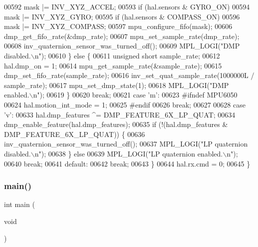 \begin{DoxyCode}
00592                 mask |= INV\_XYZ\_ACCEL;
00593             \textcolor{keywordflow}{if} (hal.sensors & GYRO_ON)
00594                 mask |= INV\_XYZ\_GYRO;
00595             \textcolor{keywordflow}{if} (hal.sensors & COMPASS_ON)
00596                 mask |= INV\_XYZ\_COMPASS;
00597             mpu\_configure\_fifo(mask);
00606             dmp\_get\_fifo\_rate(&dmp\_rate);
00607             mpu\_set\_sample\_rate(dmp\_rate);
00608             inv\_quaternion\_sensor\_was\_turned\_off();
00609             MPL\_LOGI(\textcolor{stringliteral}{"DMP disabled.\(\backslash\)n"});
00610         \} \textcolor{keywordflow}{else} \{
00611             \textcolor{keywordtype}{unsigned} \textcolor{keywordtype}{short} sample\_rate;
00612             hal.dmp_on = 1;
00614             mpu\_get\_sample\_rate(&sample\_rate);
00615             dmp\_set\_fifo\_rate(sample\_rate);
00616             inv\_set\_quat\_sample\_rate(1000000L / sample\_rate);
00617             mpu\_set\_dmp\_state(1);
00618             MPL\_LOGI(\textcolor{stringliteral}{"DMP enabled.\(\backslash\)n"});
00619         \}
00620         \textcolor{keywordflow}{break};
00621     \textcolor{keywordflow}{case} \textcolor{charliteral}{'m'}:
00623 \textcolor{preprocessor}{    #ifndef MPU6050 }
00624 \textcolor{preprocessor}{    hal.motion\_int\_mode = 1;}
00625 \textcolor{preprocessor}{    #endif }
00626         \textcolor{keywordflow}{break};
00627 
00628     \textcolor{keywordflow}{case} \textcolor{charliteral}{'v'}:
00633         hal.dmp_features ^= DMP\_FEATURE\_6X\_LP\_QUAT;
00634         dmp\_enable\_feature(hal.dmp_features);
00635         \textcolor{keywordflow}{if} (!(hal.dmp_features & DMP\_FEATURE\_6X\_LP\_QUAT)) \{
00636             inv\_quaternion\_sensor\_was\_turned\_off();
00637             MPL\_LOGI(\textcolor{stringliteral}{"LP quaternion disabled.\(\backslash\)n"});
00638         \} \textcolor{keywordflow}{else}
00639             MPL\_LOGI(\textcolor{stringliteral}{"LP quaternion enabled.\(\backslash\)n"});
00640         \textcolor{keywordflow}{break};
00641     \textcolor{keywordflow}{default}:
00642         \textcolor{keywordflow}{break};
00643     \}
00644     hal.rx.cmd = 0;
00645 \}
\end{DoxyCode}
\mbox{\label{group__eMPL_ga840291bc02cba5474a4cb46a9b9566fe}} 
\subsubsection{main()}
{\footnotesize\ttfamily int main (\begin{DoxyParamCaption}\item[{void}]{ }\end{DoxyParamCaption})}



